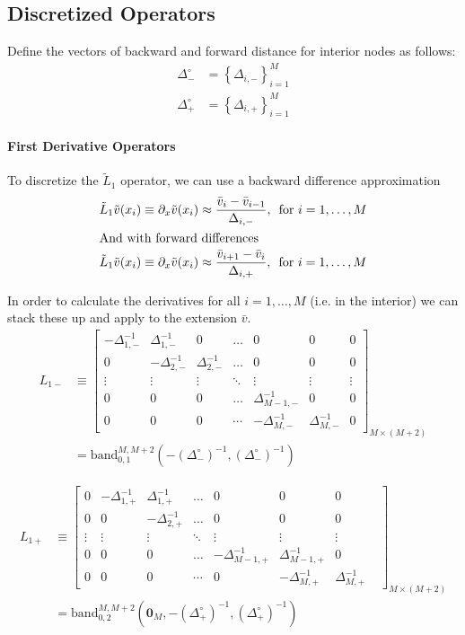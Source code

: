 \documentclass[11pt]{article}
\newcommand{\set}[1]{\ensuremath{\left\{{#1}\right\}}}
\newcommand{\band}{\ensuremath{\mathrm{band}}}
\newcommand{\D}[1][]{\ensuremath{\partial_{#1}}}
\theoremstyle{definition}
\begin{document}
\subsection{Discretized Operators}

Define the vectors of backward and forward distance for interior nodes as follows:
\begin{align}
\Delta_{-}^\circ &= \set{\Delta_{i,-}}_{i=1}^M \\
\Delta_{+}^\circ &= \set{\Delta_{i,+}}_{i=1}^M
\end{align}

\paragraph{First Derivative Operators}
To discretize the $\tilde{L}_1$ operator, we can use a backward difference approximation
\begin{align}
\tilde{L}_1 \tilde{v}(x_i) &\equiv \D[x] \tilde{v}(x_i) \approx \frac{\bar{v}_i - \bar{v}_{i-1}}{\Delta_{i,-}},\, \text{ for } i = 1,\ldots, M\label{eq:first-order-bd-irregular}\\
\intertext{And with forward differences}
\tilde{L}_1 \tilde{v}(x_i) &\equiv \D[x] \tilde{v}(x_i) \approx \frac{\bar{v}_{i+1} - \bar{v}_i}{\Delta_{i,+}},\, \text{ for } i = 1,\ldots, M\label{eq:first-order-fd-irregular}
\end{align}

In order to calculate the derivatives for all $i = 1, \ldots, M$ (i.e. in the interior) we can stack these up and apply to the extension $\bar{v}$.
\begin{align}\label{eq:L-1-minus-extended}
{L}_{1-} &\equiv\begin{bmatrix}
-\Delta_{1,-}^{-1}&\Delta_{1,-}^{-1}&0&\dots&0&0&0\\
0&-\Delta_{2,-}^{-1}&\Delta_{2,-}^{-1}&\dots&0&0&0\\
\vdots&\vdots&\vdots&\ddots&\vdots&\vdots&\vdots\\
0&0&0&\dots&\Delta_{M-1,-}^{-1}&0&0\\
0&0&0&\cdots&-\Delta_{M,-}^{-1}&\Delta_{M,-}^{-1}&0
\end{bmatrix}_{M\times (M+2)} \\
&= 
\band^{M,M+2}_{0,1}(-(\Delta_-^\circ)^{-1}, (\Delta_-^\circ)^{-1})
\end{align}

\begin{align}\label{eq:L-1-plus-extended}
{L}_{1+} &\equiv \begin{bmatrix}
0&-\Delta_{1,+}^{-1}&\Delta_{1,+}^{-1}&\dots&0&0&0\\
0&0&-\Delta_{2,+}^{-1}&\dots&0&0&0\\
\vdots&\vdots&\vdots&\ddots&\vdots&\vdots&\vdots\\
0&0&0&\dots&-\Delta_{M-1,+}^{-1}&\Delta_{M-1,+}^{-1}&0\\
0&0&0&\cdots&0&-\Delta_{M,+}^{-1}&\Delta_{M,+}^{-1}&
\end{bmatrix}_{M\times (M+2)} \\
&= 
\band^{M,M+2}_{0,2}(\mathbf{0}_M, -(\Delta_+^\circ)^{-1}, (\Delta_+^\circ)^{-1})
\end{align}
\end{document}
